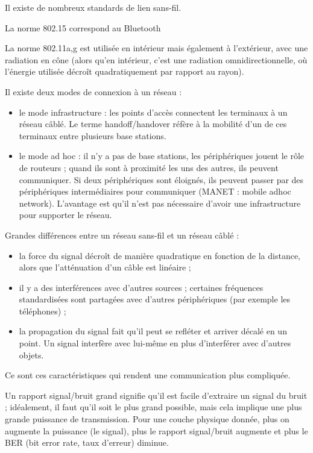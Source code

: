 	Il existe de nombreux standards de lien sans-fil.
	
	
	La norme 802.15 correspond au Bluetooth
	
	La norme 802.11a,g est utilisée en intérieur mais également à l'extérieur, avec une radiation en cône (alors qu'en intérieur, c'est une radiation omnidirectionnelle, où l'énergie utilisée décroît quadratiquement par rapport au rayon).
	
		
	Il existe deux modes de connexion à un réseau :
	
	\begin{itemize}
		\item le mode infrastructure : les points d'accès connectent les terminaux à un réseau câblé. Le terme handoff/handover réfère à la mobilité d'un de ces terminaux entre plusieurs base stations.
		
		\item le mode ad hoc : il n'y a pas de base stations, les périphériques jouent le rôle de routeurs ; quand ils sont à proximité les uns des autres, ils peuvent communiquer. Si deux périphériques sont éloignés, ils peuvent passer par des périphériques intermédiaires pour communiquer (MANET : mobile adhoc network).
	L'avantage est qu'il n'est pas nécessaire d'avoir une infrastructure pour supporter le réseau.
	\end{itemize}
		
		
		
	Grandes différences entre un réseau sans-fil et un réseau câblé :
	
	\begin{itemize}
		\item la force du signal décroît de manière quadratique en fonction de la distance, alors que l'atténuation d'un câble est linéaire ;
		\item il y a des interférences avec d'autres sources ; certaines fréquences standardisées sont partagées avec d'autres périphériques (par exemple les téléphones) ;
		\item la propagation du signal fait qu'il peut se refléter et arriver décalé en un point. Un signal interfère avec lui-même en plus d'interférer avec d'autres objets.
	\end{itemize}
	
	Ce sont ces caractéristiques qui rendent une communication plus compliquée.
	
	
	Un rapport signal/bruit grand signifie qu'il est facile d'extraire un signal du bruit ; idéalement, il faut qu'il soit le plus grand possible, mais cela implique une plus grande puissance de transmission. Pour une couche physique donnée, plus on augmente la puissance (le signal), plus le rapport signal/bruit augmente et plus le BER (bit error rate, taux d'erreur) diminue.
	
